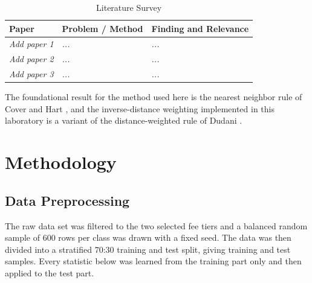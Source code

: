 \documentclass[conference]{IEEEtran}
\begin{document}
\begin{table}[h]
\centering
\caption{Literature Survey}
\label{tab:literature}

\begin{tabular}{|p{1.4cm}|p{2.0cm}|p{3.8cm}|}

\hline

\textbf{Paper} &
\textbf{Problem / Method} &
\textbf{Finding and Relevance}

\\ \hline

\textit{Add paper 1} & \textit{...} & \textit{...} \\ \hline

\textit{Add paper 2} & \textit{...} & \textit{...} \\ \hline

\textit{Add paper 3} & \textit{...} & \textit{...} \\ \hline

\end{tabular}

\end{table}

The foundational result for the method used here is the nearest neighbor rule of Cover and Hart \cite{cover1967}, and the inverse-distance weighting implemented in this laboratory is a variant of the distance-weighted rule of Dudani \cite{dudani1976}.


\section{Methodology}

\subsection{Data Preprocessing}

The raw data set was filtered to the two selected fee tiers and a balanced random sample of 600 rows per class was drawn with a fixed seed. The data was then divided into a stratified 70:30 training and test split, giving \nTrain{} training and \nTest{} test samples. Every statistic below was learned from the training part only and then applied to the test part.
\end{document}
